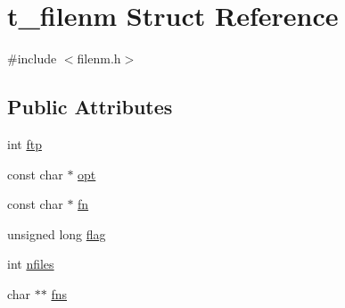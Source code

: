 \hypertarget{structt__filenm}{\section{t\-\_\-filenm \-Struct \-Reference}
\label{structt__filenm}
}


{\ttfamily \#include $<$filenm.\-h$>$}

\subsection*{\-Public \-Attributes}
\begin{DoxyCompactItemize}
\item 
int \hyperlink{structt__filenm_acf045291fceda287a4e9fe4758812195}{ftp}
\item 
const char $\ast$ \hyperlink{structt__filenm_a6331c1b994de210d677c1d8e986d6f2b}{opt}
\item 
const char $\ast$ \hyperlink{structt__filenm_a5d0b3a73afb65aca0a48c4bf03dcfc7f}{fn}
\item 
unsigned long \hyperlink{structt__filenm_a5229ed45472d5edf342bff402715f286}{flag}
\item 
int \hyperlink{structt__filenm_ace26dce9bca926099a7744c43a3d7914}{nfiles}
\item 
char $\ast$$\ast$ \hyperlink{structt__filenm_ac5e7a7514798eb08ecba4a4bae53c176}{fns}
\end{DoxyCompactItemize}


